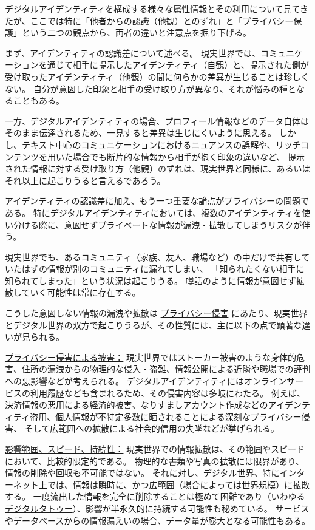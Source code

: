 \documentclass[uplatex]{jsarticle}
\def\label#1{}%
\begin{document}
デジタルアイデンティティを構成する様々な属性情報とその利用について見てきたが、ここでは特に「他者からの認識（他観）とのずれ」と「プライバシー保護」という二つの観点から、両者の違いと注意点を掘り下げる。

まず、アイデンティティの認識差について述べる。
現実世界では、コミュニケーションを通じて相手に提示したアイデンティティ（自観）と、提示された側が受け取ったアイデンティティ（他観）の間に何らかの差異が生じることは珍しくない。
自分が意図した印象と相手の受け取り方が異なり、それが悩みの種となることもある。

一方、デジタルアイデンティティの場合、プロフィール情報などのデータ自体はそのまま伝達されるため、一見すると差異は生じにくいように思える。
しかし、テキスト中心のコミュニケーションにおけるニュアンスの誤解や、リッチコンテンツを用いた場合でも断片的な情報から相手が抱く印象の違いなど、
提示された情報に対する受け取り方（他観）のずれは、現実世界と同様に、あるいはそれ以上に起こりうると言えるであろう。

アイデンティティの認識差に加え、もう一つ重要な論点がプライバシーの問題である。
特にデジタルアイデンティティにおいては、複数のアイデンティティを使い分ける際に、意図せずプライベートな情報が漏洩・拡散してしまうリスクが伴う。

\begin{exa}[コミュニティをまたぐ情報の漏洩]\label{exa:ch1-community-leak}
現実世界でも、あるコミュニティ（家族、友人、職場など）の中だけで共有していたはずの情報が別のコミュニティに漏れてしまい、
「知られたくない相手に知られてしまった」という状況は起こりうる。
噂話のように情報が意図せず拡散していく可能性は常に存在する。
\end{exa}

こうした意図しない情報の漏洩や拡散は \underline{プライバシー侵害} にあたり、現実世界とデジタル世界の双方で起こりうるが、その性質には、主に以下の点で顕著な違いが見られる。

\underline{プライバシー侵害による被害：}
現実世界ではストーカー被害のような身体的危害、住所の漏洩からの物理的な侵入・盗難、情報公開による近隣や職場での評判への悪影響などが考えられる。
デジタルアイデンティティにはオンラインサービスの利用履歴なども含まれるため、その侵害内容は多岐にわたる。
例えば、決済情報の悪用による経済的被害、なりすましアカウント作成などのアイデンティティ盗用、個人情報が不特定多数に晒されることによる深刻なプライバシー侵害、
そして広範囲への拡散による社会的信用の失墜などが挙げられる。

\underline{影響範囲、スピード、持続性：}
現実世界での情報拡散は、その範囲やスピードにおいて、比較的限定的である。
物理的な書類や写真の拡散には限界があり、情報の削除や回収も不可能ではない。
それに対し、デジタル世界、特にインターネット上では、情報は瞬時に、かつ広範囲（場合によっては世界規模）に拡散する。
一度流出した情報を完全に削除することは極めて困難であり（いわゆる \underline{デジタルタトゥー}）、影響が半永久的に持続する可能性も秘めている。
サービスやデータベースからの情報漏えいの場合、データ量が膨大となる可能性もある。
\end{document}
